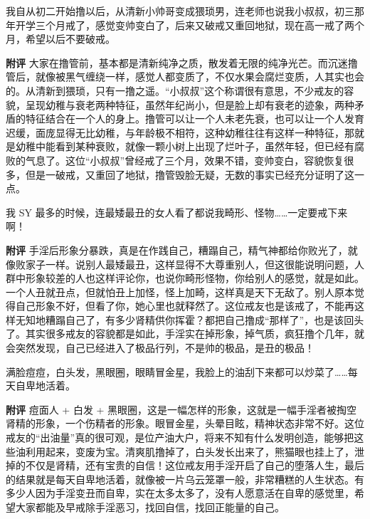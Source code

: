 \begin{case}[变丑]
    我自从初二开始撸以后，从清新小帅哥变成猥琐男，连老师也说我小叔叔，初三那年开学三个月戒了，感觉变帅变白了，后来又破戒又重回地狱，现在高一戒了两个月，希望以后不要破戒。

    \textbf{附评} 大家在撸管前，基本都是清新纯净之质，散发着无限的纯净光芒。而沉迷撸管后，就像被黑气缠绕一样，感觉人都变质了，不仅水果会腐烂变质，人其实也会的。从清新到猥琐，只有一撸之遥。“小叔叔”这个称谓很有意思，不少戒友的容貌，呈现幼稚与衰老两种特征，虽然年纪尚小，但是脸上却有衰老的迹象，两种矛盾的特征结合在一个人的身上。撸管可以让一个人未老先衰，也可以让一个人发育迟缓，面庞显得无比幼稚，与年龄极不相符，这种幼稚往往有这样一种特征，那就是幼稚中能看到某种衰败，就像一颗小树上出现了烂叶子，虽然年轻，但已经有腐败的气息了。这位“小叔叔”曾经戒了三个月，效果不错，变帅变白，容貌恢复很多，但是一破戒，又重回了地狱，撸管毁脸无疑，无数的事实已经充分证明了这一点。
\end{case}

\begin{case}[变丑]
    我 SY 最多的时候，连最矮最丑的女人看了都说我畸形、怪物……一定要戒下来啊！

    \textbf{附评} 手淫后形象分暴跌，真是在作践自己，糟蹋自己，精气神都给你败光了，就像败家子一样。说别人最矮最丑，这样显得不大尊重别人，但这很能说明问题，人群中形象较差的人也这样评论你，也说你畸形怪物，你给别人的感觉，就是如此。一个人丑就丑点，但就怕丑上加怪，怪上加畸，这样真是天下无敌了。别人原本觉得自己形象不好，但看了你，她心里也就释然了。这位戒友也是该戒了，不能再这样无知地糟蹋自己了，有多少肾精供你挥霍？都把自己撸成“那样了”，也是该回头了。其实很多戒友的容貌都是如此，手淫实在掉形象，掉气质，疯狂撸个几年，就会突然发现，自己已经进入了极品行列，不是帅的极品，是丑的极品！
\end{case}

\begin{case}[变丑]
    满脸痘痘，白头发，黑眼圈，眼睛冒金星，我脸上的油刮下来都可以炒菜了……每天自卑地活着。

    \textbf{附评} 痘面人 + 白发 + 黑眼圈，这是一幅怎样的形象，这就是一幅手淫者被掏空肾精的形象，一个伤精者的形象。眼冒金星，头晕目眩，精神状态非常不好。这位戒友的“出油量”真的很可观，是位产油大户，将来不知有什么发明创造，能够把这些油利用起来，变废为宝。清爽肌撸掉了，白头发长出来了，熊猫眼也挂上了，泄掉的不仅是肾精，还有宝贵的自信！这位戒友用手淫开启了自己的堕落人生，最后的结果就是每天自卑地活着，就像被一片乌云笼罩一般，非常糟糕的人生状态。有多少人因为手淫变丑而自卑，实在太多太多了，没有人愿意活在自卑的感觉里，希望大家都能及早戒除手淫恶习，找回自信，找回正能量的自己。
\end{case}

